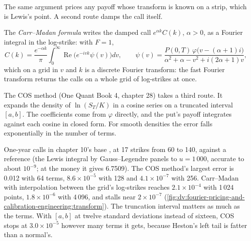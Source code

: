 The same argument prices any payoff whose transform is known on a strip, which is Lewis's point. A second route damps the call itself.

\begin{definition}\label{def:dv:fourier-pricing-and-calibration-engineering:cm}
The \emph{Carr--Madan formula} writes the damped call $e^{\alpha k}C(k)$, $\alpha>0$, as a Fourier integral in the
log-strike: with $F=1$,
\[
C(k)=\frac{e^{-\alpha k}}{\pi}\int_0^\infty\operatorname{Re}\bigl(e^{-ivk}\psi(v)\bigr)dv,\qquad
\psi(v)=\frac{P(0,T)\,\varphi\bigl(v-(\alpha+1)i\bigr)}{\alpha^2+\alpha-v^2+i(2\alpha+1)v},
\]
which on a grid in $v$ and $k$ is a discrete Fourier transform: the fast Fourier transform returns the calls on a whole grid of log-strikes
at once.
\end{definition}

The COS method (One Quant Book 4, chapter 28) takes a third route. It expands the density of $\ln(S_T/K)$ in a cosine series on a
truncated interval $[a,b]$. The coefficients come from $\varphi$ directly, and the put's payoff integrates against each cosine in closed form.
For smooth densities the error falls exponentially in the number of terms.

\begin{example}\label{ex:dv:fourier-pricing-and-calibration-engineering:cos}
One-year calls in chapter 10's base , at 17 strikes from 60 to 140, against a reference (the Lewis integral by Gauss--Legendre
panels to $u=1\,000$, accurate to about $10^{-9}$; at the money it gives 6.7509). The COS method's largest error is 0.012 with 64 terms,
$8.6\times10^{-5}$ with 128 and $4.1\times10^{-7}$ with 256. Carr--Madan with interpolation between the grid's log-strikes reaches
$2.1\times10^{-4}$ with 1\,024 points, $1.8\times10^{-6}$ with 4\,096, and stalls near $2\times10^{-7}$
(\cref{fig:dv:fourier-pricing-and-calibration-engineering:transform}). The truncation interval matters as much as the terms. With $[a,b]$ at
twelve standard deviations instead of sixteen, COS stops at $3.0\times10^{-5}$ however many terms it gets, because Heston's left tail is
fatter than a normal's.
\end{example}

